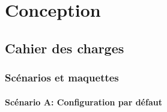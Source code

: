 \documentclass[17pts]{report}
\begin{document}
\chapter{Conception}\thispagestyle{IHA-fancy-style}
\label{cha:Conception}
    \section{Cahier des charges}
    \label{sec:Cahier des charges}
        \subsection{Scénarios et maquettes}
        \label{sub:Scénarios et maquettes}

\subsubsection{Scénario A: Configuration par défaut}
\label{sssub:Scénario A: Configuration par défaut}
\end{document}
